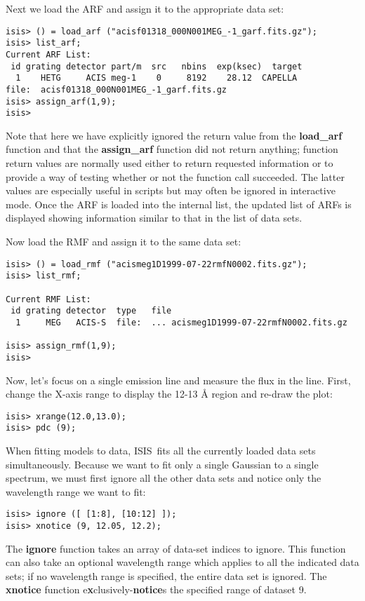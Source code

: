 \documentclass{book}
\newcommand{\isisx}{{\sc ISIS~}}
\begin{document}
{Next we load the ARF and assign it to the appropriate data set:
\begin{verbatim}
isis> () = load_arf ("acisf01318_000N001MEG_-1_garf.fits.gz");
isis> list_arf;
Current ARF List:
 id grating detector part/m  src   nbins  exp(ksec)  target
  1    HETG     ACIS meg-1    0     8192    28.12  CAPELLA
file:  acisf01318_000N001MEG_-1_garf.fits.gz
isis> assign_arf(1,9);
isis>
\end{verbatim}
Note that here we have explicitly ignored the return value from the
{\bf load\_arf} function and that the {\bf assign\_arf} function did
not return anything;  function return values are normally used
either to return requested information or to provide a way of testing
whether or not the function call succeeded.  The latter values are
especially useful in scripts but may often be ignored in interactive mode.
Once the ARF is loaded into the internal list, the updated list of ARFs
is displayed showing information similar to that in the list of
data sets.

Now load the RMF and assign it to the same data set:
\begin{verbatim}
isis> () = load_rmf ("acismeg1D1999-07-22rmfN0002.fits.gz");
isis> list_rmf;

Current RMF List:
 id grating detector  type   file
  1     MEG   ACIS-S  file:  ... acismeg1D1999-07-22rmfN0002.fits.gz

isis> assign_rmf(1,9);
isis>
\end{verbatim}

Now, let's focus on a single emission line and measure the flux in
the line. First, change the X-axis range to display the 12-13 \AA
region and re-draw the plot:
\begin{verbatim}
isis> xrange(12.0,13.0);
isis> pdc (9);
\end{verbatim}
When fitting models to data, \isisx fits all the currently loaded data sets
simultaneously.  Because we want to fit only a single Gaussian to a single
spectrum, we must first ignore all the other data sets and notice only the
wavelength range we want to fit:
\begin{verbatim}
isis> ignore ([ [1:8], [10:12] ]);
isis> xnotice (9, 12.05, 12.2);
\end{verbatim}
The {\bf ignore} function takes an array of data-set indices to
ignore. This function can also take an optional wavelength range
which applies to all the indicated data sets; if no wavelength range is
specified, the entire data set is ignored.  The {\bf xnotice}
function e{\bf x}clusively-{\bf notice}s the specified range
of dataset 9.

}
\end{document}
